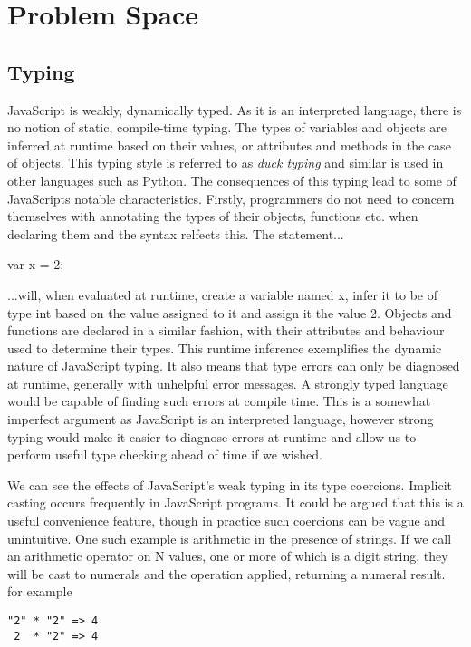 \section{Problem Space}

\subsection{Typing}
JavaScript is weakly, dynamically typed. As it is an interpreted language,
there is no notion of static, compile-time typing. The types of variables
and objects are inferred at runtime based on their values, or attributes and
methods in the case of objects. This typing style is referred to as\emph{
duck typing} and similar is used in other languages such as Python. The
consequences of this typing lead to some of JavaScripts notable characteristics.
Firstly, programmers do not need to concern themselves with annotating the
types of their objects, functions etc. when declaring them and the syntax
relfects this. The statement...
\begin{center}
var x = 2;		
\end{center}
\noindent ...will, when evaluated at runtime, create a variable named x, infer
it to be of type int based on the value assigned to it and assign it the
value 2. Objects and functions are declared in a similar fashion, with their
attributes and behaviour used to determine their types. This runtime inference
exemplifies the dynamic nature of JavaScript typing. It also means that
type errors can only be diagnosed at runtime, generally with unhelpful 
error messages. A strongly typed language would be capable of finding such
errors at compile time. This is a somewhat imperfect argument as JavaScript
is an interpreted language, however strong typing would make it easier to
diagnose errors at runtime and allow us to perform useful type checking
ahead of time if we wished.

We can see the effects of JavaScript's weak typing in its type coercions. 
Implicit casting occurs frequently in JavaScript programs. It could be argued
that this is a useful convenience feature, though in practice such coercions
can be vague and unintuitive. One such example is arithmetic in the presence
of strings. If we call an arithmetic operator on N values,
one or more of which is a digit string, they will be cast to numerals and
the operation applied, returning a numeral result. for example

\begin{center}
	\verb!"2" * "2" => 4! \\
	\verb! 2  * "2" => 4!
\end{center}


